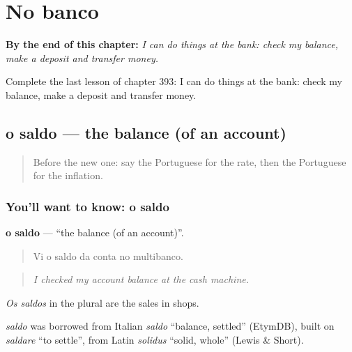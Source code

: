 
\chapter{No banco}
\label{ch:pt-no-banco}

\begin{chapteropening}
\textbf{By the end of this chapter:} \emph{I can do things at the bank: check my balance, make a deposit and transfer money.}

Complete the last lesson of chapter 393: I can do things at the bank: check my balance, make a deposit and transfer money.
\end{chapteropening}

\section[o saldo]{o saldo — the balance (of an account)}

\label{lesson:PT-C393-saldo}



\begin{quote}
Before the new one: say the Portuguese for the rate, then the Portuguese for the inflation.
\end{quote}

\subsection*{You'll want to know: o saldo}
\textbf{o saldo} — \textquotedblleft{}the balance (of an account)\textquotedblright{}.

\begin{quote}
Vi o saldo da conta no multibanco.
\end{quote}

\begin{quote}
\emph{I checked my account balance at the cash machine.}
\end{quote}

\emph{Os saldos} in the plural are the sales in shops.

\begin{cousinweb}
\emph{saldo} was borrowed from Italian \emph{saldo} \textquotedblleft{}balance, settled\textquotedblright{} (EtymDB), built on \emph{saldare} \textquotedblleft{}to settle\textquotedblright{}, from Latin \emph{solidus} \textquotedblleft{}solid, whole\textquotedblright{} (Lewis \& Short).
\end{cousinweb}


